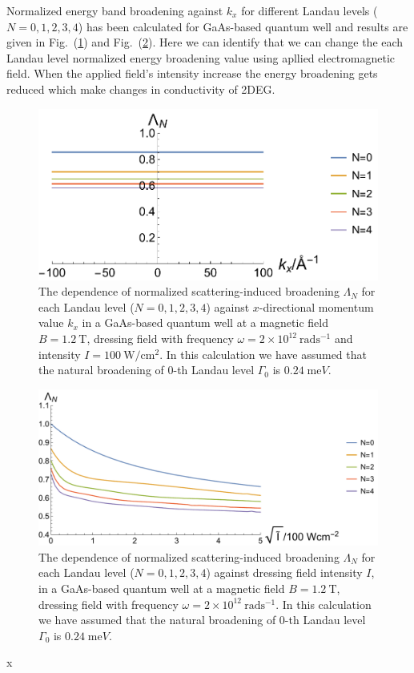 Normalized energy band broadening against ${k_x}$ for different Landau levels ($N = 0,1,2,3,4$) has been calculated for GaAs-based quantum well and results are given in Fig.~(\ref{fig_3}) and Fig.~(\ref{fig_4}). Here we can identify that we can change the each Landau level normalized energy broadening value using apllied electromagnetic field. When the applied field's intensity increase the energy broadening gets reduced which make changes in conductivity of 2DEG.
\begin{figure}[t]
\includegraphics[scale=0.55]{figures/fig_3}
\caption{\label{fig_3} The dependence of normalized scattering-induced broadening $\Lambda_N$ for each Landau level ($N =0,1,2,3,4$) against $x$-directional momentum value $k_x$ in a GaAs-based quantum well at a magnetic field $B = 1.2~\text{T}$, dressing field with frequency $\omega =2\times10^{12}~\text{rad}\text{s}^{-1}$ and intensity $I =100~\text{W}/\text{cm}^{2}$. In this calculation we have assumed that the natural  broadening of $0$-th Landau level $\Gamma_0$ is $0.24\;\text{me}V$.}
\end{figure}
\begin{figure}[t]
\includegraphics[scale=0.45]{figures/fig_4}
\caption{\label{fig_4} The dependence of normalized scattering-induced broadening $\Lambda_N$ for each Landau level ($N =0,1,2,3,4$) against dressing field intensity $I$, in a GaAs-based quantum well at a magnetic field $B = 1.2~\text{T}$, dressing field with frequency $\omega =2\times10^{12}~\text{rad}\text{s}^{-1}$. In this calculation we have assumed that the natural broadening of $0$-th Landau level $\Gamma_0$ is $0.24\;\text{me}V$.}
\end{figure}

























x
